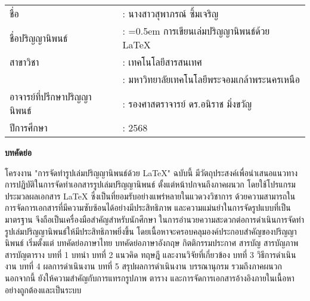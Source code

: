 {}
\begin{tabularx}{\textwidth}{lX}
ชื่อ                           & : นางสาวสุพาภรณ์ ซิ้มเจริญ         %
\\
ชื่อปริญญานิพนธ์                  & : \hangindent=0.5em          %
                                การเขียนเล่มปริญญานิพนธ์ด้วย LaTeX  %
\\
สาขาวิชา                       & : เทคโนโลยีสารสนเทศ %
\\
                             & : มหาวิทยาลัยเทคโนโลยีพระจอมเกล้าพระนครเหนือ
\\
อาจารย์ที่ปรึกษาปริญญานิพนธ์        & : รองศาสตราจารย์ ดร.อนิราช มิ่งขวัญ    %
\\
ปีการศึกษา                     & : 2568     %
\end{tabularx}

\vspace{5mm}
\begin{center}\textbf{บทคัดย่อ}\end{center}
\hspace*{1.5em} %
โครงงาน "การจัดทำรูปเล่มปริญญานิพนธ์ด้วย LaTeX" ฉบับนี้ มีวัตถุประสงค์เพื่อนำเสนอแนวทางการปฏิบัติในการจัดทำเอกสารรูปเล่มปริญญานิพนธ์ ตั้งแต่หน้าปกจนถึงภาคผนวก โดยใช้โปรแกรมประมวลผลเอกสาร LaTeX ซึ่งเป็นที่ยอมรับอย่างแพร่หลายในแวดวงวิชาการ ด้วยความสามารถในการจัดการเอกสารที่มีความซับซ้อนได้อย่างมีประสิทธิภาพ และความแม่นยำในการจัดรูปแบบที่เป็นมาตรฐาน จึงถือเป็นเครื่องมือสำคัญสำหรับนักศึกษา ในการอำนวยความสะดวกต่อการดำเนินการจัดทำรูปเล่มปริญญานิพนธ์ให้มีประสิทธิภาพยิ่งขึ้น โดยเนื้อหาจะครอบคลุมองค์ประกอบสำคัญของปริญญานิพนธ์ เริ่มตั้งแต่ บทคัดย่อภาษาไทย บทคัดย่อภาษาอังกฤษ กิตติกรรมประกาศ สารบัญ สารบัญภาพ สารบัญตาราง บทที่ 1 บทนำ บทที่ 2 แนวคิด ทฤษฎี และงานวิจัยที่เกี่ยวข้อง บทที่ 3 วิธีการดำเนินงาน บทที่ 4 ผลการดำเนินงาน บทที่ 5 สรุปผลการดำเนินงาน บรรณานุกรม รวมถึงภาคผนวก นอกจากนี้ ยังให้ความสำคัญกับการแทรกรูปภาพ ตาราง และการจัดการเอกสารอ้างอิงภายในเนื้อหาอย่างถูกต้องและเป็นระบบ

